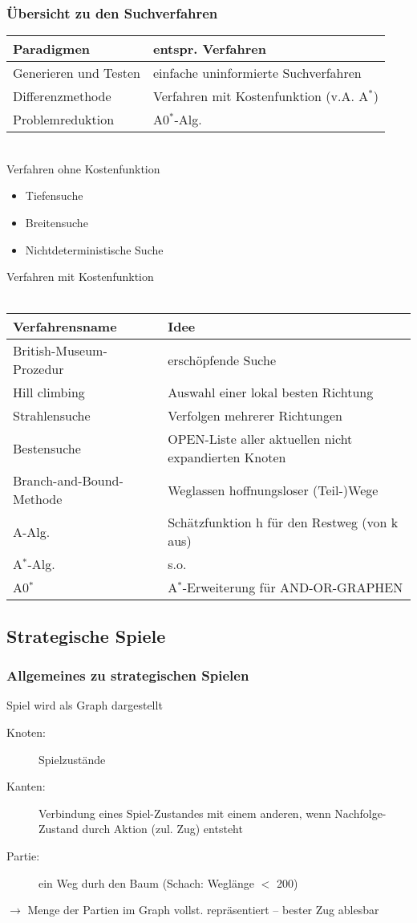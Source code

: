 \documentclass[a4paper,14pt]{article}
\begin{document}
\subsubsection{Übersicht zu den Suchverfahren}
\begin{tabular}{l|l}
Paradigmen			&	entspr. Verfahren\\\hline
Generieren und Testen		&	einfache uninformierte Suchverfahren\\
Differenzmethode		&	Verfahren mit Kostenfunktion (v.A. A$^*$)\\
Problemreduktion		&	A0$^*$-Alg.\\
\end{tabular}\\

Verfahren ohne Kostenfunktion
\begin{itemize}
 \item Tiefensuche
 \item Breitensuche
 \item Nichtdeterministische Suche
\end{itemize}

Verfahren mit Kostenfunktion\\
\\
\begin{tabular}{l|l}
Verfahrensname			&	Idee\\\hline
British-Museum-Prozedur		&	erschöpfende Suche\\
Hill climbing			&	Auswahl einer lokal besten Richtung\\
Strahlensuche			&	Verfolgen mehrerer Richtungen\\
Bestensuche			&	OPEN-Liste aller aktuellen nicht expandierten Knoten\\
Branch-and-Bound-Methode	&	Weglassen hoffnungsloser (Teil-)Wege\\
A-Alg.				&	Schätzfunktion h für den Restweg (von k aus)\\
A$^*$-Alg.			&	s.o.\\
A0$^*$				&	A$^*$-Erweiterung für AND-OR-GRAPHEN
\end{tabular}

\subsection{Strategische Spiele}
\subsubsection{Allgemeines zu strategischen Spielen}
Spiel wird als Graph dargestellt\\
\begin{description}
 \item[Knoten:] Spielzustände
 \item[Kanten:] Verbindung eines Spiel-Zustandes mit einem anderen, wenn Nachfolge-Zustand durch Aktion (zul. Zug) entsteht
 \item[Partie:] ein Weg durh den Baum (Schach: Weglänge $<$ 200)
\end{description}
$\rightarrow$ Menge der Partien im Graph vollst. repräsentiert -- bester Zug ablesbar
\end{document}
